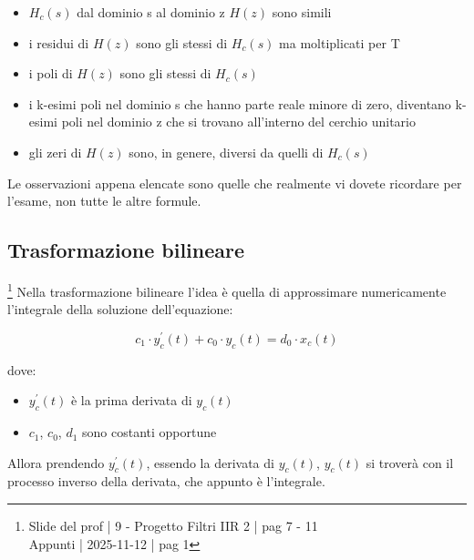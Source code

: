 \begin{itemize}
    \item $H_c \left(s\right)$ dal dominio s al dominio z $H \left(z\right)$ sono simili 
    \item i residui di $H \left( z\right)$ sono gli stessi di $H_c \left(s\right)$ ma moltiplicati per T 
    \item i poli di $H \left( z\right)$ sono gli stessi di $H_c \left(s\right)$ 
    \item i k-esimi poli nel dominio s che hanno parte reale minore di zero, diventano k-esimi poli nel dominio z che si trovano all'interno del cerchio unitario 
    \item gli zeri di $H \left(z\right)$ sono, in genere, diversi da quelli di $H_c \left(s\right)$
\end{itemize}

\begin{tcolorbox}
Le osservazioni appena elencate sono quelle che realmente vi dovete ricordare per l'esame, non tutte le altre formule.     
\end{tcolorbox}

\newpage 

\subsection{Trasformazione bilineare}

\footnote{ 
    Slide del prof | 9 - Progetto Filtri IIR 2 | pag 7 - 11 \\ 
    Appunti | 2025-11-12 | pag 1 
} 
Nella trasformazione bilineare l'idea è quella di approssimare numericamente l'integrale della soluzione dell'equazione: 

{
    \Large 
    \begin{equation}
        c_1 \cdot y^{'}_{c} \left(t\right) 
        + 
        c_0 \cdot y_{c} \left(t\right) 
        =
        d_0 \cdot x_c \left(t\right)
    \end{equation}
}

dove: 

\begin{itemize}
    \item $y^{'}_{c} \left(t\right)$ è la prima derivata di $y_c \left(t\right)$
    \item $c_1$, $c_0$, $d_1$ sono costanti opportune
\end{itemize}

Allora prendendo $y^{'}_{c} \left(t\right)$, essendo la derivata di $y_c \left(t\right)$, 
$y_c \left(t\right)$ si troverà con il processo inverso della derivata, che appunto è l'integrale. \newline 


